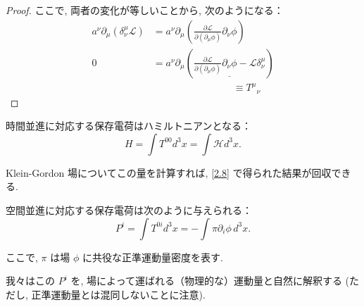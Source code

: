 \documentclass[a4paper,12pt]{article}
\begin{document}
\begin{proof}
ここで, 両者の変化が等しいことから, 次のようになる：
\begin{align*}
    a^\nu \partial_\mu (\delta^\mu_\nu \mathcal{L}) &= a^\nu \partial_\mu \left( \frac{\partial \mathcal{L}}{\partial (\partial_\mu \phi)} \partial_\nu \phi \right) \tag{2-2.i16}\\
    0 &= a^\nu \partial_\mu \left( \underline{\frac{\partial \mathcal{L}}{\partial (\partial_\mu \phi)} \partial_\nu \phi - \mathcal{L} \delta^\mu_\nu} \right) \tag{2-2.i17}\\
    &\quad \hspace{3cm} \equiv {T^\mu}_{\nu} \tag{2-2.i18}
\end{align*}

\end{proof}

\color{black}

時間並進に対応する保存電荷はハミルトニアンとなる：
\begin{equation}
H = \int T^{00} d^3x = \int \mathcal{H} d^3x.
\tag{2.18}
\end{equation}

Klein-Gordon 場についてこの量を計算すれば, \eqref{2.8} で得られた結果が回収できる.

空間並進に対応する保存電荷は次のように与えられる：
\begin{equation}
P^i = \int T^{0i} d^3x = -\int \pi \partial_i \phi \, d^3x.
\tag{2.19}
\end{equation}

ここで, $\pi$ は場 $\phi$ に共役な正準運動量密度を表す.

我々はこの $P^i$ を, 場によって運ばれる（物理的な）運動量と自然に解釈する (ただし, 正準運動量とは混同しないことに注意).
\end{document}
